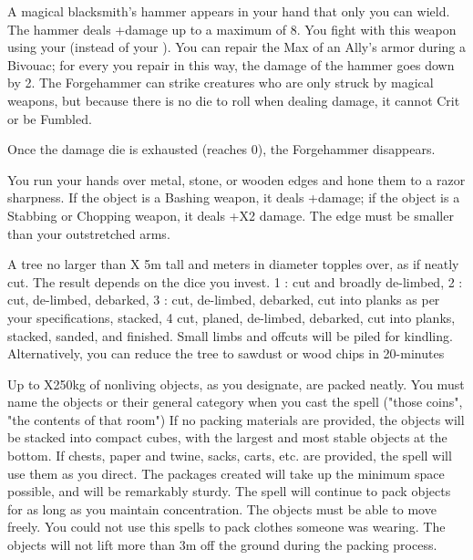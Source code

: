 {A magical blacksmith's hammer appears in your hand that only you can wield.  The hammer deals \DICE+\DICE damage up to a maximum of 8. You fight with this weapon using your \FOC (instead of your \VIG).  You can repair the Max \UD of an Ally's armor during a Bivouac; for every \DCUP you repair in this way, the damage of the hammer goes down by 2. The Forgehammer can strike creatures who are only struck by magical weapons, but because there is no die to roll when dealing damage, it cannot Crit or be Fumbled.

Once the damage die is exhausted (reaches 0), the Forgehammer disappears.


\MYSTERY [
  Name = Hone,
  Link = arcana-mystery-hone,
  Paradigm = Force,
  Save = N,
  Duration = Combat or \SUM Minutes,
  Target = Close Target(s)
]

You run your hands over \DICE metal, stone, or wooden edges and hone them to a razor sharpness. If the object is a Bashing weapon, it deals +\DICE damage; if the object is a Stabbing or Chopping weapon, it deals +\DICE X2 damage. The edge must be smaller than your outstretched arms.

\MYSTERY [
  Name = Millworks,
  Link = arcana-mystery-millworks,
  Paradigm = Entropy,
  Save = N,
  Duration = Instant,
  Target = Close Target(s)
]

A tree no larger than \DICE X 5m tall and \DICE meters in diameter topples over, as if neatly cut. The result depends on the dice you invest. 1 \DICE: cut and broadly de-limbed, 2 \DICE: cut, de-limbed, debarked, 3 \DICE: cut, de-limbed, debarked, cut into planks as per your specifications, stacked, 4 \DICE cut, planed, de-limbed, debarked, cut into planks, stacked, sanded, and finished. Small limbs and offcuts will be piled for kindling. Alternatively, you can reduce the tree to sawdust or wood chips in 20-\SUMDICE minutes


\MYSTERY [
  Name = Package Neatly,
  Link = arcana-mystery-package-neatly,
  Paradigm = Entropy,
  Save = n/a,
  Duration = Concentration or Permanent,
  Target = Nearby Target(s)
]

Up to \DICE X250kg of nonliving objects, as you designate, are packed neatly. You must name the objects or their general category when you cast the spell ("those coins", "the contents of that room") If no packing materials are provided, the objects will be stacked into compact cubes, with the largest and most stable objects at the bottom. If chests, paper and twine, sacks, carts, etc. are provided, the spell will use them as you direct. The packages created will take up the minimum space possible, and will be remarkably sturdy. The spell will continue to pack objects for as long as you maintain concentration. The objects must be able to move freely. You could not use this spells to pack clothes someone was wearing. The objects will not lift more than 3m off the ground during the packing process.

}
